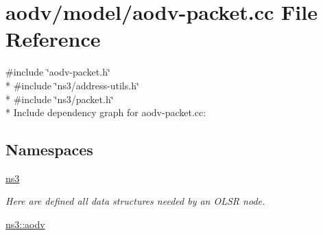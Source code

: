 \hypertarget{aodv-packet_8cc}{}\section{aodv/model/aodv-\/packet.cc File Reference}
\label{aodv-packet_8cc}
{\ttfamily \#include \char`\"{}aodv-\/packet.\+h\char`\"{}}\\*
{\ttfamily \#include \char`\"{}ns3/address-\/utils.\+h\char`\"{}}\\*
{\ttfamily \#include \char`\"{}ns3/packet.\+h\char`\"{}}\\*
Include dependency graph for aodv-\/packet.cc\+:
\subsection*{Namespaces}
\begin{DoxyCompactItemize}
\item 
 \hyperlink{namespacens3}{ns3}
\begin{DoxyCompactList}\small\item\em Here are defined all data structures needed by an O\+L\+SR node. \end{DoxyCompactList}\item 
 \hyperlink{namespacens3_1_1aodv}{ns3\+::aodv}
\end{DoxyCompactItemize}
